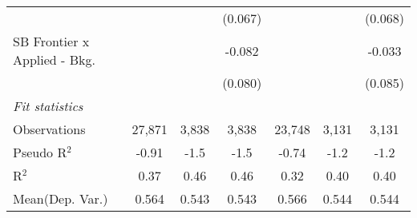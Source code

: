 \begin{tabular}{lcccccc}
                                  &                &                & (0.067)        &                &               & (0.068)\\   
   SB Frontier x Applied - Bkg.   &                &                & -0.082         &                &               & -0.033\\   
                                  &                &                & (0.080)        &                &               & (0.085)\\   
   \midrule
   \emph{Fit statistics}\\
   Observations                   & 27,871         & 3,838          & 3,838          & 23,748         & 3,131         & 3,131\\  
   Pseudo R$^2$                   & -0.91          & -1.5           & -1.5           & -0.74          & -1.2          & -1.2\\  
   R$^2$                          & 0.37           & 0.46           & 0.46           & 0.32           & 0.40          & 0.40\\  
Mean(Dep. Var.) & 0.564 & 0.543 & 0.543 & 0.566 & 0.544 & 0.544 \\
   

\end{tabular}
